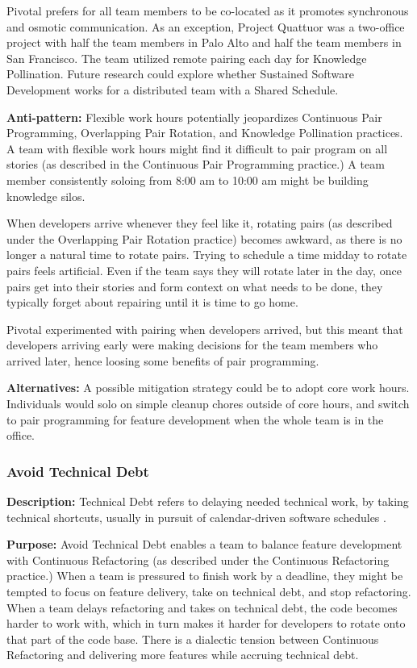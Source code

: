 \begin{table}[]
Pivotal prefers for all team members to be co-located as it promotes synchronous and osmotic communication. As an exception, Project Quattuor was a two-office project with half the team members in Palo Alto and half the team members in San Francisco. The team utilized remote pairing each day for Knowledge Pollination. Future research could explore whether Sustained Software Development works for a distributed team with a Shared Schedule.

\textbf{Anti-pattern:} Flexible work hours potentially jeopardizes Continuous Pair Programming, Overlapping Pair Rotation, and Knowledge Pollination practices. A team with flexible work hours might find it difficult to pair program on all stories (as described in the Continuous Pair Programming practice.) A team member consistently soloing from 8:00 am to 10:00 am might be building knowledge silos. 

When developers arrive whenever they feel like it, rotating pairs (as described under the Overlapping Pair Rotation practice) becomes awkward, as there is no longer a natural time to rotate pairs. Trying to schedule a time midday to rotate pairs feels artificial. Even if the team says they will rotate later in the day, once pairs get into their stories and form context on what needs to be done, they typically forget about repairing until it is time to go home.

Pivotal experimented with pairing when developers arrived, but this meant that developers arriving early were making decisions for the team members who arrived later, hence loosing some benefits of pair programming. 

\textbf{Alternatives:} A possible mitigation strategy could be to adopt core work hours. Individuals would solo on simple cleanup chores outside of core hours, and switch to pair programming for feature development when the whole team is in the office.  

\subsubsection{Avoid Technical Debt}
\textbf{Description:} Technical Debt refers to delaying needed technical work, by taking technical shortcuts, usually in pursuit of calendar-driven software schedules \cite{McConnellTechnicalDebt}.  

\textbf{Purpose:} Avoid Technical Debt enables a team to balance feature development with Continuous Refactoring  (as described under the Continuous Refactoring practice.) When a team is pressured to finish work by a deadline, they might be tempted to focus on feature delivery, take on technical debt, and stop refactoring. When a team delays refactoring and takes on technical debt, the code becomes harder to work with, which in turn makes it harder for developers to rotate onto that part of the code base. There is a dialectic tension \cite{RalphProcessTheories} between Continuous Refactoring and delivering more features while accruing technical debt.


\end{table}
